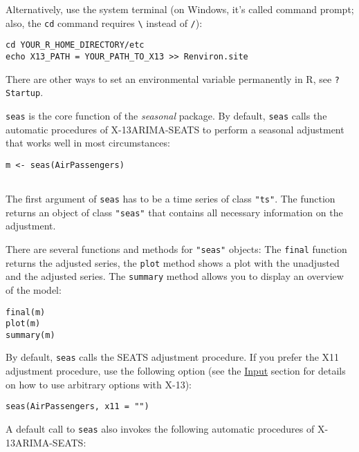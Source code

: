 Alternatively, use the system terminal (on Windows, it's called command
prompt; also, the \texttt{cd} command requires \texttt{\textbackslash{}}
instead of \texttt{/}):

\begin{verbatim}
cd YOUR_R_HOME_DIRECTORY/etc
echo X13_PATH = YOUR_PATH_TO_X13 >> Renviron.site
\end{verbatim}

There are other ways to set an environmental variable permanently in R,
see \texttt{?Startup}.


\texttt{seas} is the core function of the \emph{seasonal} package. By
default, \texttt{seas} calls the automatic procedures of X-13ARIMA-SEATS
to perform a seasonal adjustment that works well in most circumstances:

\begin{verbatim}
m <- seas(AirPassengers)
 
\end{verbatim}

The first argument of \texttt{seas} has to be a time series of class
\texttt{"ts"}. The function returns an object of class \texttt{"seas"}
that contains all necessary information on the adjustment.

There are several functions and methods for \texttt{"seas"} objects: The
\texttt{final} function returns the adjusted series, the \texttt{plot}
method shows a plot with the unadjusted and the adjusted series. The
\texttt{summary} method allows you to display an overview of the model:

\begin{verbatim}
final(m)
plot(m)
summary(m)
\end{verbatim}

By default, \texttt{seas} calls the SEATS adjustment procedure. If you
prefer the X11 adjustment procedure, use the following option (see the
\hyperref[input]{Input} section for details on how to use arbitrary
options with X-13):

\begin{verbatim}
seas(AirPassengers, x11 = "")
\end{verbatim}

A default call to \texttt{seas} also invokes the following automatic
procedures of X-13ARIMA-SEATS:

